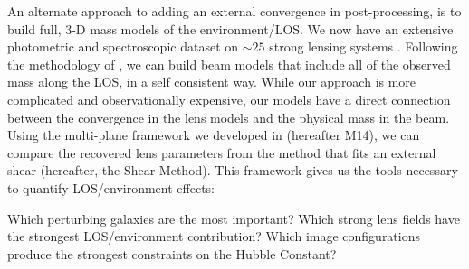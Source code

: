 An alternate approach to adding an external convergence in post-processing, is to build full, 3-D mass models of the environment/LOS.  We now have an extensive photometric and spectroscopic dataset on $\sim25$ strong lensing systems \citep{Momcheva06,Williams08,Wong11,Momcheva15}. Following the methodology of \citet{Wong11}, we can build beam models that include all of the observed mass along the LOS, in a self consistent way.  While our approach is more complicated and observationally expensive, our models have a direct connection between the convergence in the lens models and the physical mass in the beam. Using the multi-plane framework we developed in \citet{McCully14} (hereafter M14), we can compare the recovered lens parameters from the method that fits an external shear (hereafter, the Shear Method). This framework gives us the tools necessary to quantify LOS/environment effects:

Which perturbing galaxies are the most important? Which strong lens fields have the strongest LOS/environment contribution? Which image configurations produce the strongest constraints on the Hubble Constant?